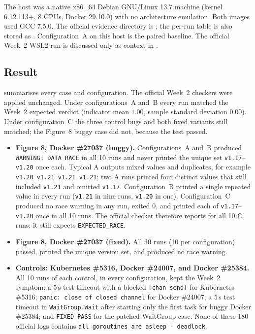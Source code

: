 The host was a native x86\_64 Debian GNU/Linux 13.7 machine (kernel 6.12.113+,
8 CPUs, Docker 29.10.0) with no architecture emulation. Both images used GCC 7.5.0.
The official evidence directory is
;
the per-run table is also stored as .
Configuration~A on this host is the paired baseline. The official Week~2 WSL2
run is discussed only as context in .

\subsection{Result}
 summarises every case and configuration.
The official Week~2 checkers were applied unchanged. Under configurations~A and~B
every run matched the Week~2 expected verdict (indicator mean $1.00$, sample
standard deviation $0.00$). Under configuration~C the three control bugs and both
fixed variants still matched; the Figure~8 buggy case did not, because the test
passed.

\begin{itemize}
  \item \textbf{Figure 8, Docker \#27037 (buggy).}
        Configurations~A and~B produced \texttt{WARNING: DATA RACE} in all 10 runs
        and never printed the unique set \texttt{v1.17}--\texttt{v1.20} once each.
        Typical A outputs mixed values and duplicates, for example
        \texttt{v1.20 v1.21 v1.21 v1.21}; two A runs printed four distinct values
        that still included \texttt{v1.21} and omitted \texttt{v1.17}.
        Configuration~B printed a single repeated value in every run
        (\texttt{v1.21} in nine runs, \texttt{v1.20} in one).
        Configuration~C produced no race warning in any run, exited 0, and printed
        each of \texttt{v1.17}--\texttt{v1.20} once in all 10 runs.
        The official checker therefore reports 
        for all 10 C runs: it still expects \texttt{EXPECTED\_RACE}.
  \item \textbf{Figure 8, Docker \#27037 (fixed).}
        All 30 runs (10 per configuration) passed, printed the unique version set,
        and produced no race warning.
  \item \textbf{Controls: Kubernetes \#5316, Docker \#24007, and Docker \#25384.}
        All 10 runs of each control, in every configuration, kept the Week~2
        symptom: a 5\,s test timeout with a blocked \texttt{[chan send]} for
        Kubernetes \#5316; \texttt{panic: close of closed channel} for Docker \#24007;
        a 5\,s test timeout in \texttt{WaitGroup.Wait} after starting only the first
        task for buggy Docker \#25384; and \texttt{FIXED\_PASS} for the patched
        WaitGroup case. None of these 180 official logs contains
        \texttt{all goroutines are asleep - deadlock}.
\end{itemize}

